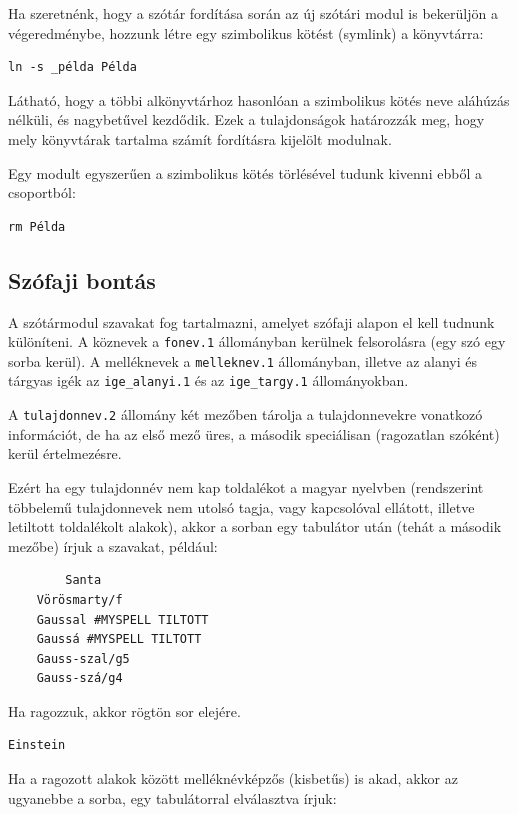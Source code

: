 Ha szeretnénk, hogy a szótár fordítása során az új szótári modul is
bekerüljön a végeredménybe, hozzunk létre egy szimbolikus kötést (symlink)
a könyvtárra:

\begin{verbatim}
ln -s _példa Példa
\end{verbatim}

Látható, hogy a többi alkönyvtárhoz hasonlóan a szimbolikus kötés neve
aláhúzás nélküli, és nagybetűvel kezdődik. Ezek a tulajdonságok határozzák
meg, hogy mely könyvtárak tartalma számít fordításra kijelölt modulnak.

Egy modult egyszerűen a szimbolikus kötés törlésével tudunk kivenni ebből a
csoportból:

\begin{verbatim}
rm Példa
\end{verbatim}

\subsection{Szófaji bontás}

A szótármodul szavakat fog tartalmazni, amelyet szófaji alapon el
kell tudnunk különíteni. A köznevek a \texttt{fonev.1} állományban
kerülnek felsorolásra (egy szó egy sorba kerül). A melléknevek
a \texttt{melleknev.1} állományban, illetve az alanyi és tárgyas igék
az \texttt{ige\_alanyi.1} és az \texttt{ige\_targy.1} állományokban.

A \texttt{tulajdonnev.2} állomány két mezőben tárolja a tulajdonnevekre
vonatkozó információt, de ha az első mező üres, a második speciálisan
(ragozatlan szóként) kerül értelmezésre.

Ezért ha egy tulajdonnév nem kap toldalékot a magyar nyelvben 
(rendszerint többelemű tulajdonnevek nem utolsó tagja, vagy
kapcsolóval ellátott, illetve letiltott toldalékolt alakok), akkor a
sorban egy tabulátor után (tehát a második mezőbe) írjuk a szavakat, például:

\begin{verbatim}
        Santa
	Vörösmarty/f
	Gaussal #MYSPELL TILTOTT
	Gaussá #MYSPELL TILTOTT
	Gauss-szal/g5
	Gauss-szá/g4	
\end{verbatim}

Ha ragozzuk, akkor rögtön sor elejére.

\begin{verbatim}
Einstein
\end{verbatim}

Ha a ragozott alakok között melléknévképzős (kisbetűs) is akad, akkor
az ugyanebbe a sorba, egy tabulátorral elválasztva írjuk:

